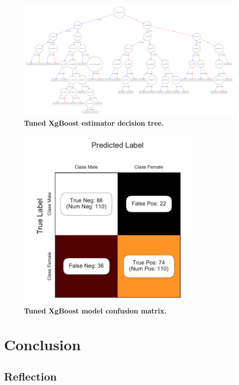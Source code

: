\begin{figure}[!hbtp]
\centering
    \includegraphics[width=1.4\textwidth]{figures/Tuned_model_graph}
    \caption{\textbf{Tuned XgBoost estimator decision tree. }\textit{}}\label{tuned_plot_tree}
\end{figure}

\begin{figure}[!hbtp]
\centering
    \includegraphics[width=0.8\textwidth]{figures/tuned_model_CM}
    \caption{\textbf{Tuned XgBoost model confusion matrix. }\textit{}}\label{tuned_CM}
\end{figure}


\chapter*{Conclusion}



\section*{Reflection}

